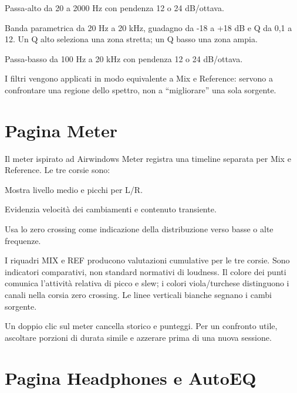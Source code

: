 \documentclass[11pt,a4paper]{article}
\newcommand{\control}[1]{\textbf{\textsf{#1}}}
\begin{document}
\begin{description}[style=nextline]
  \item[\control{HP Enabled / High Pass}] Passa-alto da 20 a 2000 Hz con
  pendenza 12 o 24 dB/ottava.
  \item[\control{Band Enabled / Band Freq / Gain / Q}] Banda parametrica da
  20 Hz a 20 kHz, guadagno da -18 a +18 dB e Q da 0,1 a 12. Un Q alto
  seleziona una zona stretta; un Q basso una zona ampia.
  \item[\control{LP Enabled / Low Pass}] Passa-basso da 100 Hz a 20 kHz con
  pendenza 12 o 24 dB/ottava.
\end{description}

I filtri vengono applicati in modo equivalente a Mix e Reference: servono a
confrontare una regione dello spettro, non a ``migliorare'' una sola sorgente.

\section{Pagina Meter}

Il meter ispirato ad Airwindows Meter registra una timeline separata per Mix e
Reference. Le tre corsie sono:

\begin{description}[style=nextline]
  \item[Loudness / Peak] Mostra livello medio e picchi per L/R.
  \item[Detail / Slew] Evidenzia velocità dei cambiamenti e contenuto
  transiente.
  \item[Fullness / Zero Cross] Usa lo zero crossing come indicazione della
  distribuzione verso basse o alte frequenze.
\end{description}

I riquadri MIX e REF producono valutazioni cumulative per le tre corsie. Sono
indicatori comparativi, non standard normativi di loudness. Il colore dei punti
comunica l'attività relativa di picco e slew; i colori viola/turchese
distinguono i canali nella corsia zero crossing. Le linee verticali bianche
segnano i cambi sorgente.

Un doppio clic sul meter cancella storico e punteggi. Per un confronto utile,
ascoltare porzioni di durata simile e azzerare prima di una nuova sessione.

\section{Pagina Headphones e AutoEQ}
\end{document}
